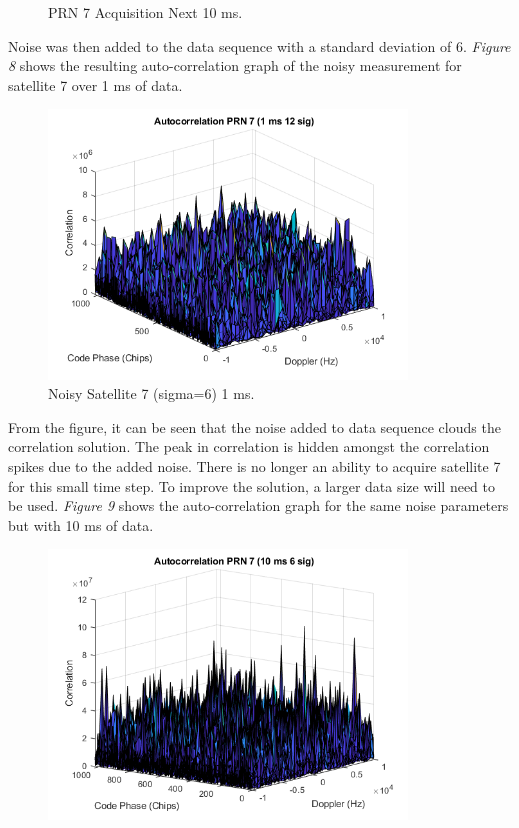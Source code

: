 \documentclass[11pt]{article}
\begin{document}
\begin{enumerate}[label=\textbf{\arabic*.}]
\begin{figure}[H]
        \caption{PRN 7 Acquisition Next 10 ms.}
    \end{figure}
Noise was then added to the data sequence with a standard deviation of 6. \emph{Figure 8} shows the resulting auto-correlation graph of the noisy measurement for satellite 7 over 1 ms of data.
    \begin{figure}[H]
        \centering
        \includegraphics[width=0.85\textwidth]{Lab_4_PRN7_6sig_1ms.png}
        \caption{Noisy Satellite 7 (sigma=6) 1 ms.}
    \end{figure}
From the figure, it can be seen that the noise added to data sequence clouds the correlation solution. The peak in correlation is hidden amongst the correlation spikes due to the added noise. There is no longer an ability to acquire satellite 7 for this small time step. To improve the solution, a larger data size will need to be used. \emph{Figure 9} shows the auto-correlation graph for the same noise parameters but with 10 ms of data.
    \begin{figure}[H]
        \centering
        \includegraphics[width=0.85\textwidth]{Lab_4_PRN7_6sig_10ms.png}

\end{figure}
\end{enumerate}
\end{document}

